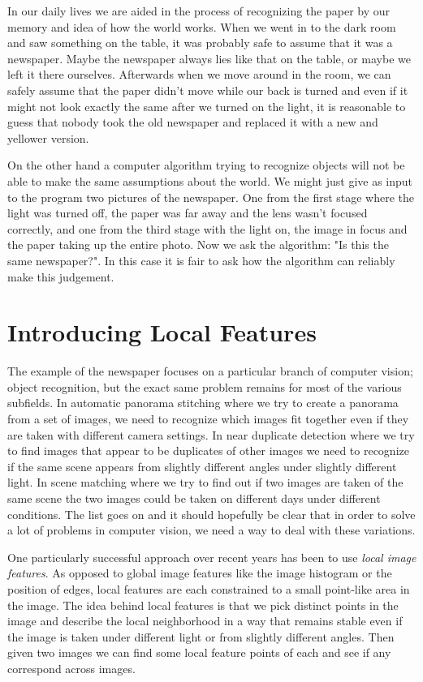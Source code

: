 In our daily lives we are aided in the process of recognizing the paper 
by our memory and idea of how the world works. When we went in to the 
dark room and saw something on the table, it was probably safe to assume 
that it was a newspaper.  Maybe the newspaper always lies like that on 
the table, or maybe we left it there ourselves. Afterwards when we move 
around in the room, we can safely assume that the paper didn't move 
while our back is turned and even if it might not look exactly the same 
after we turned on the light, it is reasonable to guess that nobody took 
the old newspaper and replaced it with a new and yellower version.

On the other hand a computer algorithm trying to recognize objects will 
not be able to make the same assumptions about the world. We might just 
give as input to the program two pictures of the newspaper. One from the 
first stage where the light was turned off, the paper was far away and 
the lens wasn't focused correctly, and one from the third stage with the 
light on, the image in focus and the paper taking up the entire photo.  
Now we ask the algorithm: "Is this the same newspaper?". In this case it 
is fair to ask how the algorithm can reliably make this judgement.

\section{Introducing Local Features}

The example of the newspaper focuses on a particular branch of computer 
vision; object recognition, but the exact same problem remains for most 
of the various subfields. In automatic panorama stitching where we try 
to create a panorama from a set of images, we need to recognize which 
images fit together even if they are taken with different camera 
settings. In near duplicate detection where we try to find images that 
appear to be duplicates of other images we need to recognize if the same 
scene appears from slightly different angles under slightly different 
light. In scene matching where we try to find out if two images are 
taken of the same scene the two images could be taken on different days 
under different conditions. The list goes on and it should hopefully be 
clear that in order to solve a lot of problems in computer vision, we 
need a way to deal with these variations.

One particularly successful approach over recent years has been to use 
\emph{local image features}. As opposed to global image features like 
the image histogram or the position of edges, local features are each 
constrained to a small point-like area in the image. The idea behind 
local features is that we pick distinct points in the image and describe 
the local neighborhood in a way that remains stable even if the image is 
taken under different light or from slightly different angles. Then 
given two images we can find some local feature points of each and see 
if any correspond across images.

